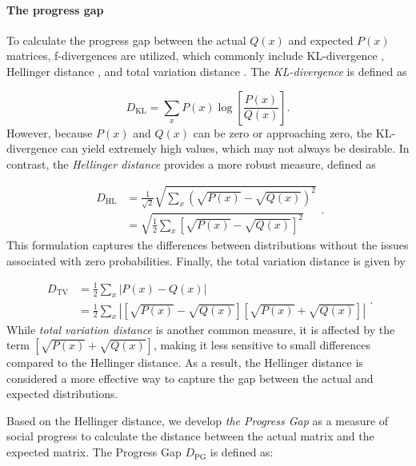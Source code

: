\paragraph{The progress gap}

To calculate the progress gap between the actual $Q(x)$ and expected $P(x)$ matrices, f-divergences are utilized, which commonly include KL-divergence \citep{csiszar1975divergence}, Hellinger distance \citep{jeffreys1946invariant}, and total variation distance \citep{chatterjee2008distances}. The \textit{KL-divergence} is defined as

\[
D_{\text{KL}} = \sum_{x} P(x) \log \left[ \frac{P(x)}{Q(x)} \right].
\]
However, because \( P(x) \) and \( Q(x) \) can be zero or approaching zero, the KL-divergence can yield extremely high values, which may not always be desirable. In contrast, the \textit{Hellinger distance} provides a more robust measure, defined as

\[
\begin{aligned}
D_{\text{HL}} &= \frac{1}{\sqrt{2}} \sqrt{\sum_{x} \left( \sqrt{P(x)} - \sqrt{Q(x)} \right)^2} \\
&= \sqrt{\frac{1}{2} \sum_{x} \left[ \sqrt{P(x)} - \sqrt{Q(x)} \right]^2}
\end{aligned}.
\]
This formulation captures the differences between distributions without the issues associated with zero probabilities. Finally, the total variation distance is given by

\[
\begin{aligned}
D_{\text{TV}} &= \frac{1}{2} \sum_{x} |P(x) - Q(x)| \\
&= \frac{1}{2} \sum_{x} \left| \left[ \sqrt{P(x)} - \sqrt{Q(x)} \right] \left[ \sqrt{P(x)} + \sqrt{Q(x)} \right] \right|
\end{aligned}.
\]
While \textit{total variation distance} is another common measure, it is affected by the term \(\left[ \sqrt{P(x)} + \sqrt{Q(x)} \right]\), making it less sensitive to small differences compared to the Hellinger distance. As a result, the Hellinger distance is considered a more effective way to capture the gap between the actual and expected distributions.

Based on the Hellinger distance, we develop \textit{the Progress Gap} as a measure of social progress to calculate the distance between the actual matrix and the expected matrix. The Progress Gap \( D_{\text{PG}} \) is defined as:

